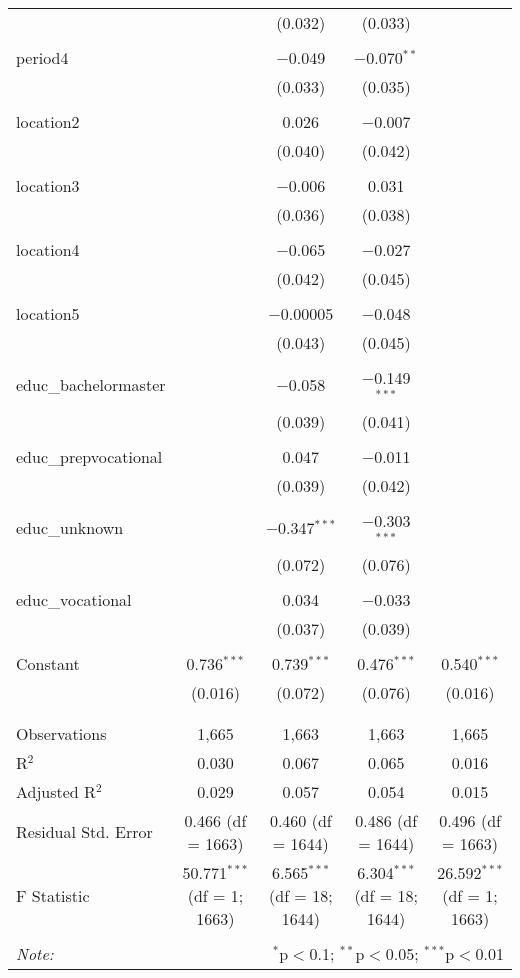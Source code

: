 \documentclass[
]{article}
\begin{document}
\begin{table}[!htbp]
\begin{tabular}{@{\extracolsep{5pt}}lcccc}
  &  & (0.032) & (0.033) &  \\ 
  & & & & \\ 
 period4 &  & $-$0.049 & $-$0.070$^{**}$ &  \\ 
  &  & (0.033) & (0.035) &  \\ 
  & & & & \\ 
 location2 &  & 0.026 & $-$0.007 &  \\ 
  &  & (0.040) & (0.042) &  \\ 
  & & & & \\ 
 location3 &  & $-$0.006 & 0.031 &  \\ 
  &  & (0.036) & (0.038) &  \\ 
  & & & & \\ 
 location4 &  & $-$0.065 & $-$0.027 &  \\ 
  &  & (0.042) & (0.045) &  \\ 
  & & & & \\ 
 location5 &  & $-$0.00005 & $-$0.048 &  \\ 
  &  & (0.043) & (0.045) &  \\ 
  & & & & \\ 
 educ\_bachelormaster &  & $-$0.058 & $-$0.149$^{***}$ &  \\ 
  &  & (0.039) & (0.041) &  \\ 
  & & & & \\ 
 educ\_prepvocational &  & 0.047 & $-$0.011 &  \\ 
  &  & (0.039) & (0.042) &  \\ 
  & & & & \\ 
 educ\_unknown &  & $-$0.347$^{***}$ & $-$0.303$^{***}$ &  \\ 
  &  & (0.072) & (0.076) &  \\ 
  & & & & \\ 
 educ\_vocational &  & 0.034 & $-$0.033 &  \\ 
  &  & (0.037) & (0.039) &  \\ 
  & & & & \\ 
 Constant & 0.736$^{***}$ & 0.739$^{***}$ & 0.476$^{***}$ & 0.540$^{***}$ \\ 
  & (0.016) & (0.072) & (0.076) & (0.016) \\ 
  & & & & \\ 
\hline \\[-1.8ex] 
Observations & 1,665 & 1,663 & 1,663 & 1,665 \\ 
R$^{2}$ & 0.030 & 0.067 & 0.065 & 0.016 \\ 
Adjusted R$^{2}$ & 0.029 & 0.057 & 0.054 & 0.015 \\ 
Residual Std. Error & 0.466 (df = 1663) & 0.460 (df = 1644) & 0.486 (df = 1644) & 0.496 (df = 1663) \\ 
F Statistic & 50.771$^{***}$ (df = 1; 1663) & 6.565$^{***}$ (df = 18; 1644) & 6.304$^{***}$ (df = 18; 1644) & 26.592$^{***}$ (df = 1; 1663) \\ 
\hline 
\hline \\[-1.8ex] 
\textit{Note:}  & \multicolumn{4}{r}{$^{*}$p$<$0.1; $^{**}$p$<$0.05; $^{***}$p$<$0.01} \\ 
\end{tabular} 
\end{table}
\end{document}
